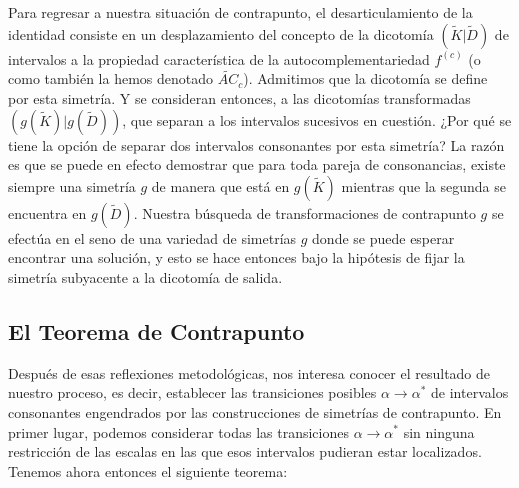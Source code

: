 \documentclass[letterpaper,12pt]{book}
\theoremstyle{definition} \newtheorem{Def}{Definición}[chapter]
\theoremstyle{definition} \newtheorem{Teo}{Teorema}[chapter]
\theoremstyle{definition} \newtheorem{Pro}{Proposición}[chapter]
\theoremstyle{definition} \newtheorem{Lema}{Lema}[chapter]
\begin{document}
Para regresar a nuestra situación de contrapunto, el desarticulamiento de la identidad consiste en un desplazamiento del concepto de la dicotomía $(\tilde{K}| \tilde{D})$ de intervalos a la propiedad característica de la autocomplementariedad $f^{(c)}$ (o como también la hemos denotado $\widetilde{AC}_c$). Admitimos que la dicotomía se define por esta simetría. Y se consideran entonces, a las dicotomías transformadas $(g(\tilde{K})| g(\tilde{D}))$, que separan a los intervalos sucesivos en cuestión. ¿Por qué se tiene la opción de separar dos intervalos consonantes por esta simetría? La razón es que se puede en efecto demostrar que para toda pareja de consonancias, existe siempre una simetría $g$ de manera que está en $g(\tilde{K})$ mientras que la segunda se encuentra en $g(\tilde{D})$. Nuestra búsqueda de transformaciones de contrapunto $g$ se efectúa en el seno de una variedad de simetrías $g$ donde se puede esperar encontrar una solución, y esto se hace entonces bajo la hipótesis de fijar la simetría subyacente a la dicotomía de salida.  

\subsection{El Teorema de Contrapunto}

Después de esas reflexiones metodológicas, nos interesa conocer el resultado de nuestro proceso, es decir, establecer las transiciones posibles $\alpha \to \alpha^*$ de intervalos consonantes engendrados por las construcciones de simetrías de contrapunto.
En primer lugar, podemos considerar todas las transiciones $\alpha \to \alpha^*$ sin ninguna restricción de las escalas en las que esos intervalos pudieran estar localizados. Tenemos ahora entonces el siguiente teorema:
\end{document}
